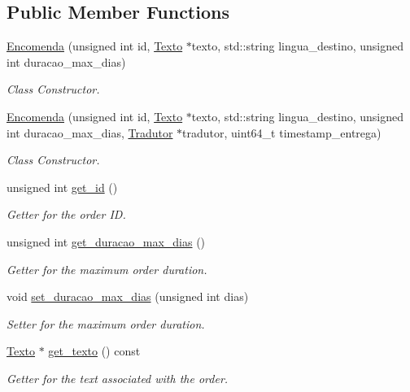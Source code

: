 \subsection*{Public Member Functions}
\begin{DoxyCompactItemize}
\item 
\hyperlink{class_encomenda_acd872b2d444252423746ee7529b48ae8}{Encomenda} (unsigned int id, \hyperlink{class_texto}{Texto} $\ast$texto, std\-::string lingua\-\_\-destino, unsigned int duracao\-\_\-max\-\_\-dias)
\begin{DoxyCompactList}\small\item\em Class Constructor. \end{DoxyCompactList}\item 
\hyperlink{class_encomenda_a5009ce207f856836a16e93a6454e93b8}{Encomenda} (unsigned int id, \hyperlink{class_texto}{Texto} $\ast$texto, std\-::string lingua\-\_\-destino, unsigned int duracao\-\_\-max\-\_\-dias, \hyperlink{class_tradutor}{Tradutor} $\ast$tradutor, uint64\-\_\-t timestamp\-\_\-entrega)
\begin{DoxyCompactList}\small\item\em Class Constructor. \end{DoxyCompactList}\item 
unsigned int \hyperlink{class_encomenda_a600345853bc2238c189de0afcd1c8d09}{get\-\_\-id} ()
\begin{DoxyCompactList}\small\item\em Getter for the order I\-D. \end{DoxyCompactList}\item 
unsigned int \hyperlink{class_encomenda_a179dcd8d6ccaa8de0bf87a922c5ce2f8}{get\-\_\-duracao\-\_\-max\-\_\-dias} ()
\begin{DoxyCompactList}\small\item\em Getter for the maximum order duration. \end{DoxyCompactList}\item 
void \hyperlink{class_encomenda_ab3b5fc8fdde834b5c80f42ff0a2bf88b}{set\-\_\-duracao\-\_\-max\-\_\-dias} (unsigned int dias)
\begin{DoxyCompactList}\small\item\em Setter for the maximum order duration. \end{DoxyCompactList}\item 
\hyperlink{class_texto}{Texto} $\ast$ \hyperlink{class_encomenda_a0a31fd2124968159893d3257b9cadd15}{get\-\_\-texto} () const 
\begin{DoxyCompactList}\small\item\em Getter for the text associated with the order. \end{DoxyCompactList}\item 

\end{DoxyCompactItemize}
